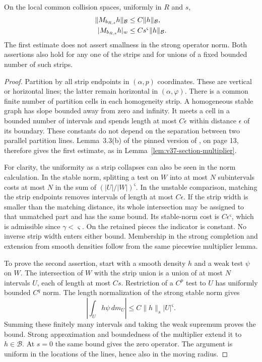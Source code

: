\begin{lemma}
\label{lem:v48-thin-multiplier}
On the local common collision spaces, uniformly in $R$ and $s$,
\begin{align}
 \|M_{b_{R,s}}h\|_{\mathcal B}&\le C\|h\|_{\mathcal B},
                                                        \notag\\
 |M_{b_{R,s}}h|_w&\le Cs^{\varsigma}\|h\|_{\mathcal B}.
                                      \label{eq:v48-strip-norms}
\end{align}
The first estimate does not assert smallness in the strong operator
norm. Both assertions also hold for any one of the strips and for
unions of a fixed bounded number of such strips.
\end{lemma}
\begin{proof}
Partition by all strip endpoints in $(\alpha,p)$ coordinates. These
are vertical or horizontal lines; the latter remain horizontal in
$(\alpha,\varphi)$. There is a common finite number of partition
cells in each homogeneity strip. A homogeneous stable graph has
slope bounded away from zero and infinity. It meets a cell in a
bounded number of intervals and spends length at most $C\epsilon$
within distance $\epsilon$ of its boundary. These constants do not
depend on the separation between two parallel partition lines.
Lemma~3.3(b) of the pinned version of \cite{DPZ}, on page 13,
therefore gives the first estimate, as in
Lemma~\ref{lem:v37-section-multiplier}.

For clarity, the uniformity as a strip collapses can also be seen in
the norm calculation. In the stable norm, splitting a test on $W$
into at most $N$ subintervals costs at most $N$ in the sum of
$(|U|/|W|)^{\varsigma}$. In the unstable comparison, matching the
strip endpoints removes intervals of length at most $C\epsilon$.
If the strip width is smaller than the matching distance, its whole
intersection may be assigned to that unmatched part and has the same
bound. Its stable-norm cost is $C\epsilon^{\varsigma}$, which is
admissible since $\gamma<\varsigma$. On the retained pieces the
indicator is constant. No inverse strip width enters either bound.
Membership in the strong completion and extension from smooth
densities follow from the same piecewise multiplier lemma.

To prove the second assertion, start with a smooth density $h$ and a
weak test $\psi$ on $W$. The intersection of $W$ with the strip union
is a union of at most $N$ intervals $U$, each of length at most $Cs$.
Restriction of a $C^p$ test to $U$ has uniformly bounded $C^q$ norm.
The length normalization of the strong stable norm gives
\[
 \left|\int_U h\psi\,dm_U\right|
       \le C\|h\|_s |U|^{\varsigma}.
\]
Summing these finitely many intervals and taking the weak supremum
proves the bound. Strong approximation and boundedness of the
multiplier extend it to $h\in\mathcal B$. At $s=0$ the same bound
gives the zero operator. The argument is uniform in the locations of
the lines, hence also in the moving radius.
\end{proof}

